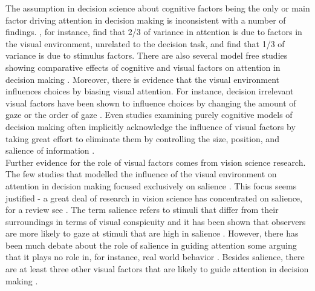 \documentclass[english,natbib,man,floatsintext]{apa6}
\begin{document}

The assumption in decision science about cognitive factors being the only or main factor driving attention in decision making is inconsistent with a number of findings. \cite{vanderlans2008}, for instance, find that 2/3 of variance in attention is due to factors in the visual environment, unrelated to the decision task, and \cite{towal2013a} find that 1/3 of variance is due to stimulus factors. There are also several model free studies showing comparative effects of cognitive and visual factors on attention in decision making \citep{gidloef2017a, orquin2015a, orquin2019a}. Moreover, there is evidence that the visual environment influences choices by biasing visual attention. For instance, decision irrelevant visual factors have been shown to influence choices by changing the amount of gaze \citep{peschel2019, chandon2009a} or the order of gaze \citep{reeck2017a}. Even studies examining purely cognitive models of decision making often implicitly acknowledge the influence of visual factors by taking great effort to eliminate them by controlling the size, position, and salience of information \citep{brandstatter2014, gloeckner2011a, perkovic2018}.\\

Further evidence for the role of visual factors comes from vision science research. The few studies that modelled the influence of the visual environment on attention in decision making focused exclusively on salience \citep{chen2013,navalpakkam2010, towal2013a}. This focus seems justified - a great deal of research in vision science has concentrated on salience, for a review see \cite{borji2012a}. The term salience refers to stimuli that differ from their surroundings in terms of visual conspicuity and it has been shown that observers are more likely to gaze at stimuli that are high in salience \cite{itti2000}. However, there has been much debate about the role of salience in guiding attention some arguing that it plays no role in, for instance, real world behavior \citep{tatler2011a}. Besides salience, there are at least three other visual factors that are likely to guide attention in decision making \citep{orquin2013a, wedel2008}.\\
\end{document}
